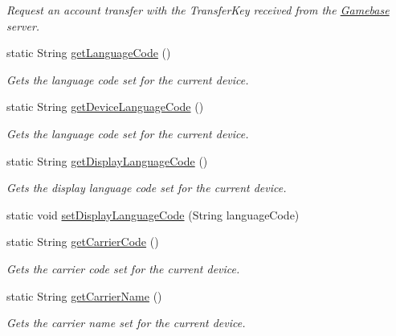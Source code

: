 \begin{DoxyCompactItemize}
\begin{DoxyCompactList}\small\item\em Request an account transfer with the Transfer\+Key received from the \hyperlink{classcom_1_1toast_1_1android_1_1gamebase_1_1_gamebase}{Gamebase} server. \end{DoxyCompactList}\item 
static String \hyperlink{classcom_1_1toast_1_1android_1_1gamebase_1_1_gamebase_af29fbd83fadd34bb0907d191e44effa0}{get\+Language\+Code} ()
\begin{DoxyCompactList}\small\item\em Gets the language code set for the current device. \end{DoxyCompactList}\item 
static String \hyperlink{classcom_1_1toast_1_1android_1_1gamebase_1_1_gamebase_a9816db7baf613297601e327207cda02d}{get\+Device\+Language\+Code} ()
\begin{DoxyCompactList}\small\item\em Gets the language code set for the current device. \end{DoxyCompactList}\item 
static String \hyperlink{classcom_1_1toast_1_1android_1_1gamebase_1_1_gamebase_a93d37838d5b242ed96a6bbd2f024c714}{get\+Display\+Language\+Code} ()
\begin{DoxyCompactList}\small\item\em Gets the display language code set for the current device. \end{DoxyCompactList}\item 
static void \hyperlink{classcom_1_1toast_1_1android_1_1gamebase_1_1_gamebase_a5a885b93b5dd0a1fa805ee9585da33b6}{set\+Display\+Language\+Code} (String language\+Code)
\item 
static String \hyperlink{classcom_1_1toast_1_1android_1_1gamebase_1_1_gamebase_aea83ba0122198c967d745bb4b8d97215}{get\+Carrier\+Code} ()
\begin{DoxyCompactList}\small\item\em Gets the carrier code set for the current device. \end{DoxyCompactList}\item 
static String \hyperlink{classcom_1_1toast_1_1android_1_1gamebase_1_1_gamebase_acd4bf4656730a81853332a4a551e5e9f}{get\+Carrier\+Name} ()
\begin{DoxyCompactList}\small\item\em Gets the carrier name set for the current device. \end{DoxyCompactList}\item 

\end{DoxyCompactItemize}
